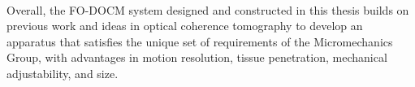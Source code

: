 \paragraph{} Overall, the FO-DOCM system designed and constructed in this thesis builds on previous work and ideas in optical coherence tomography to develop an apparatus that satisfies the unique set of requirements of the Micromechanics Group, with advantages in motion resolution, tissue penetration, mechanical adjustability, and size.
